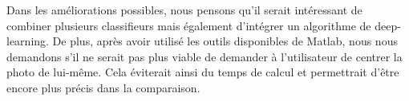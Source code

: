\documentclass{st50_template}
\begin{document}
Dans les améliorations possibles, nous pensons qu'il serait intéressant de combiner plusieurs classifieurs mais également d'intégrer un algorithme de deep-learning. De plus, après avoir utilisé les outils disponibles de Matlab, nous nous demandons s'il ne serait pas plus viable de demander à l'utilisateur de centrer la photo de lui-même. Cela éviterait ainsi du temps de calcul et permettrait d'être encore plus précis dans la comparaison.
\end{document}
